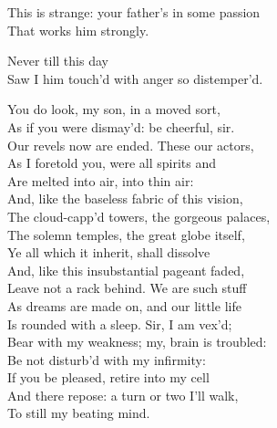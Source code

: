 \begin{verse_speech}[Ferdinand] 
This is strange: your father's in some passion\\
That works him strongly.
\end{verse_speech}

\begin{verse_speech}[Miranda] 
Never till this day\\
Saw I him touch'd with anger so distemper'd.
\end{verse_speech}

\begin{verse_speech}[Prospero] 
You do look, my son, in a moved sort,\\
As if you were dismay'd: be cheerful, sir.\\
Our revels now are ended. These our actors,\\
As I foretold you, were all spirits and\\
Are melted into air, into thin air:\\
And, like the baseless fabric of this vision,\\
The cloud-capp'd towers, the gorgeous palaces,\\
The solemn temples, the great globe itself,\\
Ye all which it inherit, shall dissolve\\
And, like this insubstantial pageant faded,\\
Leave not a rack behind. We are such stuff\\
As dreams are made on, and our little life\\
Is rounded with a sleep. Sir, I am vex'd;\\
Bear with my weakness; my, brain is troubled:\\
Be not disturb'd with my infirmity:\\
If you be pleased, retire into my cell\\
And there repose: a turn or two I'll walk,\\
To still my beating mind.
\end{verse_speech}


\exeunt{}


